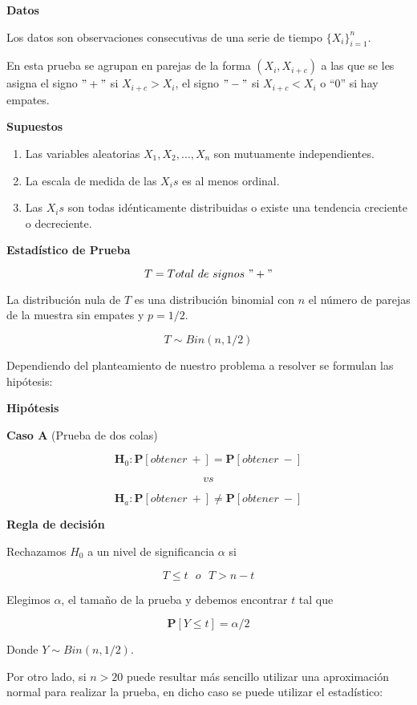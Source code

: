 \documentclass[
  a4paper,
  oneside,
  openany]{book}
\begin{document}
\textbf{Datos}

Los datos son observaciones consecutivas de una serie de tiempo \(\{X_{i}\}^{n}_{i=1}\).

En esta prueba se agrupan en parejas de la forma \((X_{i},X_{i+c})\) a las que se les asigna el signo \("+"\) si \(X_{i+c} > X_{i}\), el signo \("-"\) si \(X_{i+c} < X_{i}\) o ``0'' si hay empates.

\textbf{Supuestos}

\begin{enumerate}
\def\labelenumi{\arabic{enumi})}
\item
  Las variables aleatorias \(X_{1}, X_{2}, \ldots, X_{n}\) son mutuamente independientes.
\item
  La escala de medida de las \(X_{i}s\) es al menos ordinal.
\item
  Las \(X_{i}s\) son todas idénticamente distribuidas o existe una tendencia creciente o decreciente.
\end{enumerate}

\textbf{Estadístico de Prueba}

\[T=Total\ de\ signos\ "+"\]

La distribución nula de \(T\) es una distribución binomial con \(n\) el número de parejas de la muestra sin empates y \(p=1/2\).

\[T\sim Bin(n,1/2)\]

Dependiendo del planteamiento de nuestro problema a resolver se formulan las hipótesis:

\textbf{Hipótesis}

\textbf{Caso A} (Prueba de dos colas)

\[\textbf{H}_0: \mathbf{P}[obtener\ +]= \mathbf{P}[obtener\ -]\]

\[vs\]

\[\textbf{H}_a: \mathbf{P}[obtener\ +] \neq \mathbf{P}[obtener\ -]\]

\textbf{Regla de decisión}

Rechazamos \(H_0\) a un nivel de significancia \(\alpha\) si

\[T \leq t \ \ \  o \ \ \ T>n-t\]

Elegimos \(\alpha\), el tamaño de la prueba y debemos encontrar \(t\) tal que

\[\mathbf{P}[Y \leq t]=\alpha/2\]

Donde \(Y \sim Bin (n,1/2)\).

Por otro lado, si \(n>20\) puede resultar más sencillo utilizar una aproximación normal para realizar la prueba, en dicho caso se puede utilizar el estadístico:
\end{document}
